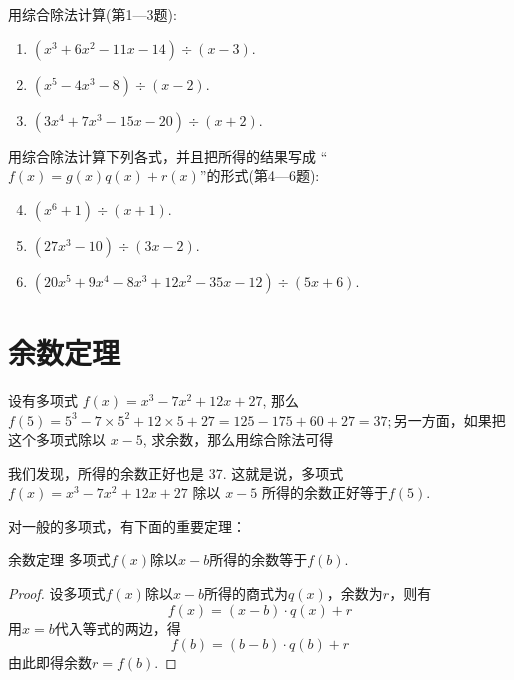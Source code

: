 \begin{ex}
    用综合除法计算(第1—3题):
\begin{enumerate}
    \item $(x^{3}+6x^{2}-11x-14)\div(x-3).$
    \item $\left(x^{5}-4x^{3}-8\right)\div\left(x-2\right).$
    \item $(3x^{4}+7x^{3}-15x-20)\div(x+2).$
\end{enumerate}

用综合除法计算下列各式，并且把所得的结果写成
“$f(x)=g(x)q(x)+r(x)$”的形式(第4—6题):
\begin{enumerate}\setcounter{enumi}{3}
    \item $( x^{6}+ 1) \div ( x+ 1) .$
    \item $(27x^{3}-10)\div(3x-2).$
    \item $\left(20x^{5}+9x^{4}-8x^{3}+12x^{2}-35x-12\right)\div\left(5x+6\right).$
\end{enumerate}
\end{ex}





\section{余数定理}

设有多项式 $f(x)=x^3-7x^2+12x+27$, 那么 $f(5)=5^3 -7\times5^{2}+12\times5+27=125-175+60+27=37;$另一方面，如果把这个多项式除以 $x-5$, 求余数，那么用综合除法可得
\begin{center}
\end{center}
我们发现，所得的余数正好也是 37. 这就是说，多项式$f(x)=
x^3-7x^2+12x+27$ 除以 $x-5$ 所得的余数正好等于$f(5)$.

对一般的多项式，有下面的重要定理：

\begin{thm}{余数定理}
    多项式$f(x)$除以$x-b$所得的余数等于$f(b)$.
\end{thm}

\begin{proof}
    设多项式$f(x)$除以$x-b$所得的商式为$q(x)$，余数为$r$，则有
\[f(x)=(x-b)\cdot q(x)+r\]
用$x=b$代入等式的两边，得
\[f(b)=(b-b)\cdot q(b)+r\]
由此即得余数$r=f(b)$.
\end{proof}

